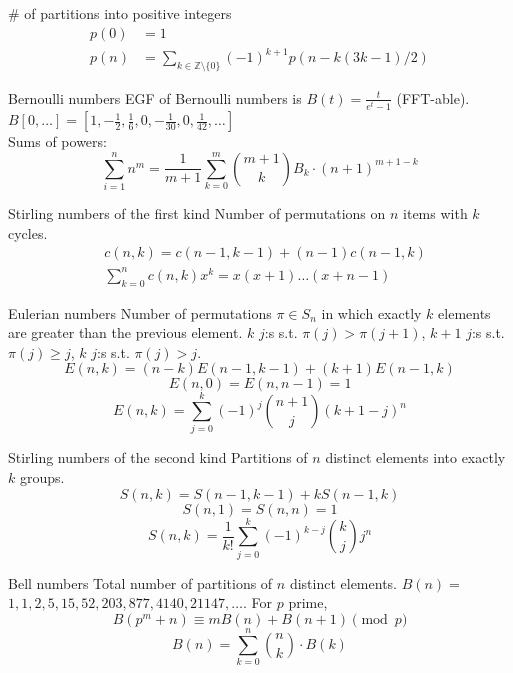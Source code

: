 \begin{misc}{\# of partitions into positive integers}
	\begin{align*}
		p(0) &= 1 \\
		p(n) &= \sum_{k \in \mathbb{Z} \setminus \{0\}} (-1)^{k+1} p(n - k(3k-1)/2)
	\end{align*}
\end{misc}

\begin{misc}{Bernoulli numbers}
	EGF of Bernoulli numbers is $B(t)=\frac{t}{e^t-1}$ (FFT-able).
	$B[0,\ldots] = [1, -\frac{1}{2}, \frac{1}{6}, 0, -\frac{1}{30}, 0, \frac{1}{42}, \ldots]$ \\
	Sums of powers:
	\small
	\[ \sum_{i=1}^n n^m = \frac{1}{m+1} \sum_{k=0}^m \binom{m+1}{k} B_k \cdot (n+1)^{m+1-k} \]
	\normalsize
\end{misc}

\begin{misc}{Stirling numbers of the first kind}
	Number of permutations on $n$ items with $k$ cycles.
	\begin{align*}
		&c(n,k) = c(n-1,k-1) + (n-1) c(n-1,k) \\
		&\textstyle \sum_{k=0}^n c(n,k)x^k = x(x+1) \dots (x+n-1)
	\end{align*}
\end{misc}

\begin{misc}{Eulerian numbers}
	Number of permutations $\pi \in S_n$ in which exactly $k$ elements are greater than the previous element. $k$ $j$:s s.t. $\pi(j)>\pi(j+1)$, $k+1$ $j$:s s.t. $\pi(j)\geq j$, $k$ $j$:s s.t. $\pi(j)>j$.
	$$E(n,k) = (n-k)E(n-1,k-1) + (k+1)E(n-1,k)$$
	$$E(n,0) = E(n,n-1) = 1$$
	$$E(n,k) = \sum_{j=0}^k(-1)^j\binom{n+1}{j}(k+1-j)^n$$
\end{misc}

\begin{misc}{Stirling numbers of the second kind}
	Partitions of $n$ distinct elements into exactly $k$ groups.
	$$S(n,k) = S(n-1,k-1) + k S(n-1,k)$$
	$$S(n,1) = S(n,n) = 1$$
	$$S(n,k) = \frac{1}{k!}\sum_{j=0}^k (-1)^{k-j}\binom{k}{j}j^n$$
\end{misc}

\begin{misc}{Bell numbers}
	Total number of partitions of $n$ distinct elements. $B(n) =$
	$1, 1, 2, 5, 15, 52, 203, 877, 4140, 21147, \dots$. For $p$ prime,
	\[ B(p^m+n)\equiv mB(n)+B(n+1) \pmod{p} \]
	$$B(n) = \sum_{k=0}^n \binom{n}{k}\cdot B(k)$$
\end{misc}

